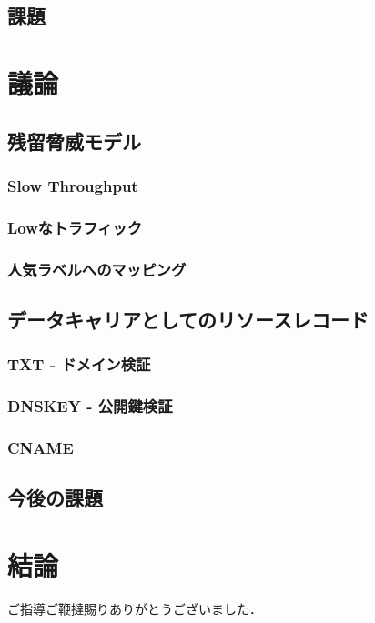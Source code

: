 \documentclass[12pt]{jarticle} %
\begin{document}
\subsection{課題}

\newpage
\section{議論}
\subsection{残留脅威モデル}
\subsubsection{Slow Throughput}
\subsubsection{Lowなトラフィック}
\subsubsection{人気ラベルへのマッピング}
\subsection{データキャリアとしてのリソースレコード}
\subsubsection{TXT - ドメイン検証}
\subsubsection{DNSKEY - 公開鍵検証}
\subsubsection{CNAME}
\subsection{今後の課題}

\newpage
\section{結論}


\newpage
\acknowledgements
ご指導ご鞭撻賜りありがとうございました．
\end{document}
